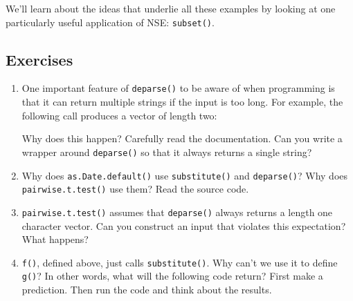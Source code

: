 We'll learn about the ideas that underlie all these examples by looking
at one particularly useful application of NSE: \texttt{subset()}.

\subsection{Exercises}

\begin{enumerate}
\def\labelenumi{\arabic{enumi}.}
\item
  One important feature of \texttt{deparse()} to be aware of when
  programming is that it can return multiple strings if the input is too
  long. For example, the following call produces a vector of length two:

\begin{Shaded}
\begin{Highlighting}[]
\StringTok{ }\StringTok{ }\StringTok{ }\StringTok{ }\StringTok{ }\StringTok{ }\StringTok{ }\StringTok{ }\StringTok{ }\StringTok{ }\StringTok{ }\StringTok{ }
\StringTok{  }\StringTok{ }\StringTok{ }\StringTok{ }\StringTok{ }\StringTok{ }\StringTok{ }\StringTok{ }\StringTok{ }\StringTok{ }\StringTok{ }\StringTok{ }\StringTok{ }
\end{Highlighting}
\end{Shaded}

  Why does this happen? Carefully read the documentation. Can you write
  a wrapper around \texttt{deparse()} so that it always returns a single
  string?
\item
  Why does \texttt{as.Date.default()} use \texttt{substitute()} and
  \texttt{deparse()}? Why does \texttt{pairwise.t.test()} use them? Read
  the source code.
\item
  \texttt{pairwise.t.test()} assumes that \texttt{deparse()} always
  returns a length one character vector. Can you construct an input that
  violates this expectation? What happens?
\item
  \texttt{f()}, defined above, just calls \texttt{substitute()}. Why
  can't we use it to define \texttt{g()}? In other words, what will the
  following code return? First make a prediction. Then run the code and
  think about the results.


\end{enumerate}
